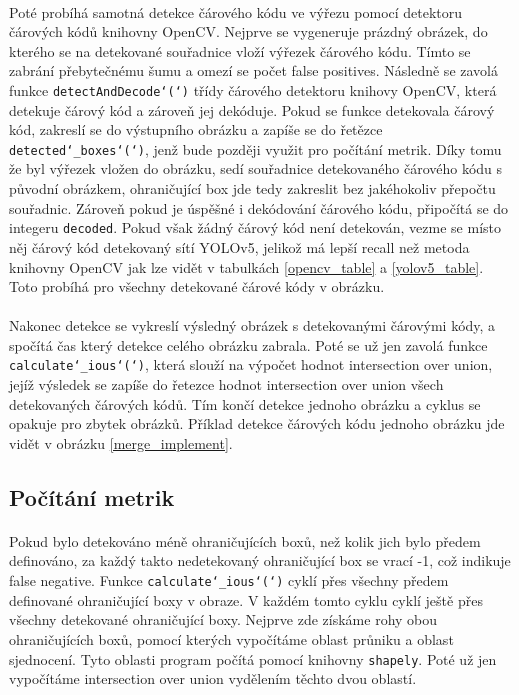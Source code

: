 \paragraph{} Poté probíhá samotná detekce čárového kódu ve výřezu pomocí detektoru čárových kódů knihovny OpenCV. Nejprve se vygeneruje prázdný obrázek, do kterého se na detekované souřadnice vloží výřezek čárového kódu. Tímto se zabrání přebytečnému šumu a omezí se počet false positives. Následně se zavolá funkce \texttt{detectAndDecode\char`(\char`)} třídy čárového detektoru knihovy OpenCV, která detekuje čárový kód a zároveň jej dekóduje. Pokud se funkce detekovala čárový kód, zakreslí se do výstupního obrázku a zapíše se do řetězce \texttt{detected\char`_boxes\char`(\char`)}, jenž bude později využit pro počítání metrik. Díky tomu že byl výřezek vložen do obrázku, sedí souřadnice detekovaného čárového kódu s původní obrázkem, ohraničující box jde tedy zakreslit bez jakéhokoliv přepočtu souřadnic. Zároveň pokud je úspěšné i dekódování čárového kódu, připočítá se do integeru \texttt{decoded}. Pokud však žádný čárový kód není detekován, vezme se místo něj čárový kód detekovaný sítí YOLOv5, jelikož má lepší recall než metoda knihovny OpenCV jak lze vidět v tabulkách \ref{opencv_table} a \ref{yolov5_table}. Toto probíhá pro všechny detekované čárové kódy v obrázku.


\paragraph{} Nakonec detekce se vykreslí výsledný obrázek s detekovanými čárovými kódy, a spočítá čas který detekce celého obrázku zabrala. Poté se už jen zavolá funkce \texttt{calculate\char`_ious\char`(\char`)}, která slouží na výpočet hodnot intersection over union, jejíž výsledek se zapíše do řetezce hodnot intersection over union všech detekovaných čárových kódů. Tím končí detekce jednoho obrázku a cyklus se opakuje pro zbytek obrázků. Příklad detekce čárových kódu jednoho obrázku jde vidět v obrázku \ref{merge_implement}.
\subsection*{Počítání metrik}
\paragraph{} Pokud bylo detekováno méně ohraničujících boxů, než kolik jich bylo předem definováno, za každý takto nedetekovaný ohraničující box se vrací -1, což indikuje false negative. Funkce \texttt{calculate\char`_ious\char`(\char`)} cyklí přes všechny předem definované ohraničující boxy v obraze. V každém tomto cyklu cyklí ještě přes všechny detekované ohraničující boxy. Nejprve zde získáme rohy obou ohraničujících boxů, pomocí kterých vypočítáme oblast průniku a oblast sjednocení. Tyto oblasti program počítá pomocí knihovny \texttt{shapely}. Poté už jen vypočítáme intersection over union vydělením těchto dvou oblastí.

